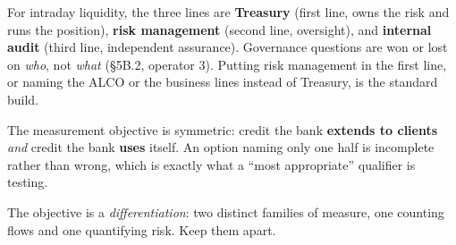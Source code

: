 \begin{lrtrapbox}
For intraday liquidity, the three lines are \textbf{Treasury} (first line, owns the risk and runs the position), \textbf{risk management} (second line, oversight), and \textbf{internal audit} (third line, independent assurance). Governance questions are won or lost on \emph{who}, not \emph{what} (\S5B.2, operator 3). Putting risk management in the first line, or naming the ALCO or the business lines instead of Treasury, is the standard build.
\end{lrtrapbox}

\begin{lrtrapbox}
The measurement objective is symmetric: credit the bank \textbf{extends to clients} \emph{and} credit the bank \textbf{uses} itself. An option naming only one half is incomplete rather than wrong, which is exactly what a ``most appropriate'' qualifier is testing.
\end{lrtrapbox}


The objective is a \emph{differentiation}: two distinct families of measure, one counting flows and one quantifying risk. Keep them apart.

